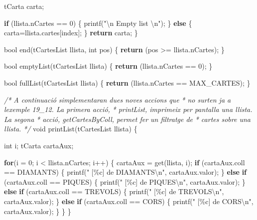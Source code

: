 \documentclass[]{book}
\newenvironment{Shaded}{\begin{snugshade}}{\end{snugshade}}
\newcommand{\CommentTok}[1]{\textcolor[rgb]{0.56,0.35,0.01}{\textit{#1}}}
\newcommand{\ControlFlowTok}[1]{\textcolor[rgb]{0.13,0.29,0.53}{\textbf{#1}}}
\newcommand{\DataTypeTok}[1]{\textcolor[rgb]{0.13,0.29,0.53}{#1}}
\newcommand{\DecValTok}[1]{\textcolor[rgb]{0.00,0.00,0.81}{#1}}
\newcommand{\NormalTok}[1]{#1}
\newcommand{\SpecialCharTok}[1]{\textcolor[rgb]{0.00,0.00,0.00}{#1}}
\newcommand{\StringTok}[1]{\textcolor[rgb]{0.31,0.60,0.02}{#1}}
\begin{document}
\begin{Shaded}
\begin{Highlighting}[]
\NormalTok{    tCarta carta;}

    \ControlFlowTok{if}\NormalTok{ (llista.nCartes == }\DecValTok{0}\NormalTok{) \{}
\NormalTok{        printf(}\StringTok{"}\SpecialCharTok{\textbackslash{}n}\StringTok{ Empty list }\SpecialCharTok{\textbackslash{}n}\StringTok{"}\NormalTok{);}
\NormalTok{    \} }\ControlFlowTok{else}\NormalTok{ \{}
\NormalTok{        carta=llista.cartes[index];}
\NormalTok{    \}}
    \ControlFlowTok{return}\NormalTok{ carta;}
\NormalTok{\}}

\DataTypeTok{bool}\NormalTok{ end(tCartesList llista, }\DataTypeTok{int}\NormalTok{ pos) \{}
    \ControlFlowTok{return}\NormalTok{ (pos \textgreater{}= llista.nCartes);}
\NormalTok{\}}

\DataTypeTok{bool}\NormalTok{ emptyList(tCartesList llista) \{}
    \ControlFlowTok{return}\NormalTok{ (llista.nCartes == }\DecValTok{0}\NormalTok{);}
\NormalTok{\}}

\DataTypeTok{bool}\NormalTok{ fullList(tCartesList llista) \{}
    \ControlFlowTok{return}\NormalTok{ (llista.nCartes == MAX\_CARTES);}
\NormalTok{\}}

\CommentTok{/* A continuació s\textquotesingle{}implementaran dues noves accions que}
\CommentTok{ * no surten ja a l\textquotesingle{}exemple 19\_12. La primera acció, }
\CommentTok{ * printList, imprimeix per pantalla una llista. La segona}
\CommentTok{ * acció, getCartesByColl, permet fer un filtratge de }
\CommentTok{ * cartes sobre una llista. }
\CommentTok{ */}
\DataTypeTok{void}\NormalTok{ printList(tCartesList llista) \{}

    \DataTypeTok{int}\NormalTok{ i;}
\NormalTok{    tCarta cartaAux;}

    \ControlFlowTok{for}\NormalTok{(i = }\DecValTok{0}\NormalTok{; i \textless{} llista.nCartes; i++) \{ }
\NormalTok{        cartaAux = get(llista, i);}
        \ControlFlowTok{if}\NormalTok{ (cartaAux.coll == DIAMANTS) \{}
\NormalTok{            printf(}\StringTok{" [\%c] de DIAMANTS}\SpecialCharTok{\textbackslash{}n}\StringTok{"}\NormalTok{, cartaAux.valor);}
\NormalTok{        \} }\ControlFlowTok{else} \ControlFlowTok{if}\NormalTok{ (cartaAux.coll == PIQUES) \{}
\NormalTok{            printf(}\StringTok{" [\%c] de PIQUES}\SpecialCharTok{\textbackslash{}n}\StringTok{"}\NormalTok{, cartaAux.valor);}
\NormalTok{        \} }\ControlFlowTok{else} \ControlFlowTok{if}\NormalTok{ (cartaAux.coll == TREVOLS) \{}
\NormalTok{            printf(}\StringTok{" [\%c] de TREVOLS}\SpecialCharTok{\textbackslash{}n}\StringTok{"}\NormalTok{, cartaAux.valor);}
\NormalTok{        \} }\ControlFlowTok{else} \ControlFlowTok{if}\NormalTok{ (cartaAux.coll == CORS) \{}
\NormalTok{            printf(}\StringTok{" [\%c] de CORS}\SpecialCharTok{\textbackslash{}n}\StringTok{"}\NormalTok{, cartaAux.valor);}
\NormalTok{        \}}
\NormalTok{    \}}
\NormalTok{\}}


\end{Highlighting}
\end{Shaded}
\end{document}

